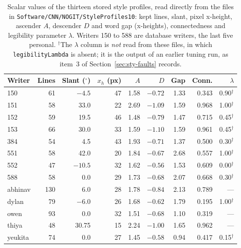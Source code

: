 \begin{table}[!htbp]
\centering
\fontsize{7.5}{9}\selectfont
\setlength{\tabcolsep}{2.5pt}
\begin{tabular}{|l|r|r|r|r|r|r|r|r|}
\hline
\textbf{Writer} & \textbf{Lines} & \textbf{Slant ($^\circ$)} & \textbf{$x_h$ (px)} & \textbf{$A$} & \textbf{$D$} & \textbf{Gap} & \textbf{Conn.} & \textbf{$\lambda$} \\
\hline
150 & 61 & $-4.5$ & 47 & 1.58 & $-0.72$ & 1.33 & 0.343 & 0.90$^\dagger$ \\
151 & 58 & 33.0 & 22 & 2.69 & $-1.09$ & 1.59 & 0.968 & 1.00$^\dagger$ \\
152 & 59 & 19.5 & 46 & 1.48 & $-0.79$ & 1.47 & 0.715 & 0.45$^\dagger$ \\
153 & 66 & 30.0 & 33 & 1.59 & $-1.10$ & 1.59 & 0.961 & 0.45$^\dagger$ \\
384 & 54 & 4.5 & 43 & 1.93 & $-0.71$ & 1.37 & 0.500 & 0.30$^\dagger$ \\
551 & 58 & 42.0 & 20 & 1.84 & $-0.67$ & 2.68 & 0.557 & 1.00$^\dagger$ \\
552 & 47 & $-10.5$ & 32 & 1.62 & $-0.56$ & 1.53 & 0.609 & 0.00$^\dagger$ \\
588 & 58 & 0.0 & 29 & 1.73 & $-0.68$ & 2.07 & 0.668 & 0.30$^\dagger$ \\
abhinav & 130 & 6.0 & 28 & 1.78 & $-0.84$ & 2.13 & 0.789 & --- \\
dylan & 79 & $-6.0$ & 26 & 1.68 & $-0.62$ & 1.79 & 0.195 & 1.00$^\dagger$ \\
owen & 93 & 0.0 & 32 & 1.51 & $-0.68$ & 1.10 & 0.319 & --- \\
thiya & 48 & 30.75 & 15 & 2.24 & $-1.00$ & 1.65 & 0.962 & --- \\
yeukita & 74 & 0.0 & 27 & 1.45 & $-0.58$ & 0.94 & 0.417 & 0.15$^\dagger$ \\
\hline
\end{tabular}
\caption{Scalar values of the thirteen stored style profiles, read directly from the files in \texttt{Software/CNN/NOGIT/StyleProfiles10}: kept lines, slant, pixel x-height, ascender $A$, descender $D$ and word gap (x-heights), connectedness and legibility parameter $\lambda$. Writers 150 to 588 are database writers, the last five personal. $^\dagger$The $\lambda$ column is \emph{not} read from these files, in which \texttt{legibilityLambda} is absent; it is the output of an earlier tuning run, as item~3 of Section~\ref{sec:sty-faults} records.}
\label{tab:sty-writers}
\end{table}

